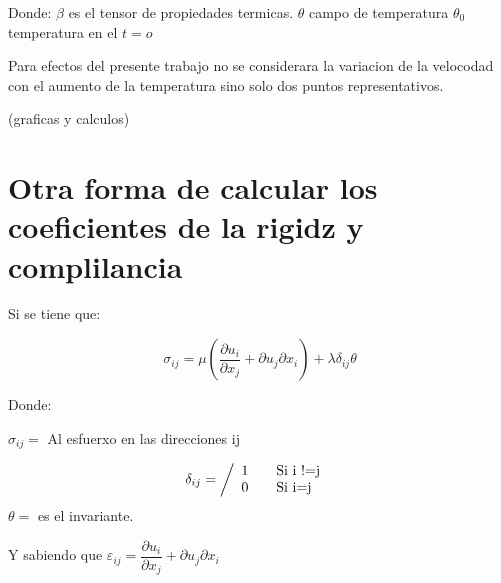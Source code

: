 \documentclass{article}
\begin{document}
Donde: 
$\beta$ es el tensor de propiedades termicas. 
$\theta$ campo de temperatura
$\theta_{0}$ temperatura en el $t=o$

Para  efectos  del presente trabajo no se considerara la  variacion de la velocodad  con el aumento de la temperatura sino solo  dos  puntos  representativos. 

(graficas y calculos) 

\section{Otra  forma  de  calcular los coeficientes de la  rigidz  y complilancia} 

Si se  tiene que:
 
\begin{equation}
 \sigma_{ij}= \mu (\dfrac{\partial u_{i}}{\partial x_{j}} + {\partial u_{j}}{\partial x_{i}})+ \lambda \delta_{ij}\theta
\end{equation}

Donde:

$\sigma_{ij}=$  Al esfuerxo en las direcciones ij

\[ \delta_{ij} = \left/{
 \begin{array}{l l}
    1 & \quad \text{Si i !=j }\\
    0 & \quad \text{Si i=j}\\ 
 \end{array} 
}\right. \]
$\theta=$ es el invariante. 
 
Y  sabiendo  que $\varepsilon_{ij} = \dfrac{\partial u_{i}}{\partial x_{j}} + {\partial u_{j}}{\partial x_{i}}$ 
\end{document}
